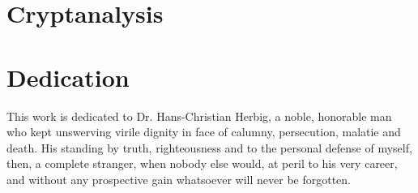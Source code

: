 \documentclass[a4paper,10pt]{article}
\theoremstyle{plain}
\theoremstyle{definition}
\theoremstyle{named}
\begin{document}
\section{Cryptanalysis}

\section{Dedication}

This work is dedicated to Dr. Hans-Christian Herbig, a noble, honorable man who kept unswerving virile dignity in face of calumny, persecution, malatie and death. His standing by truth, righteousness and to the personal defense of myself, then, a complete stranger, when nobody else would, at peril to his very career, and without any prospective gain whatsoever will never be forgotten.
\end{document}
